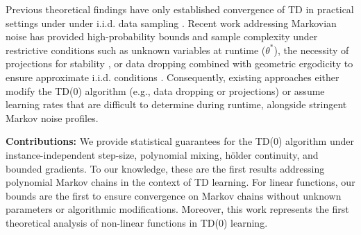 Previous theoretical findings have only established convergence of TD in practical settings under under i.i.d. data sampling \cite{tsitsiklis1996analysis, samsonov24}.
Recent work addressing Markovian noise has provided high-probability bounds and sample complexity under restrictive conditions such as unknown variables at runtime \cite{li2024high} ($\theta^*$), the necessity of projections for stability \cite{korda2015td, patil2023finite}, or data dropping combined with geometric ergodicity to ensure approximate i.i.d. conditions \cite{samsonov24}.
Consequently, existing approaches either modify the TD(0) algorithm (e.g., data dropping or projections) or assume learning rates that are difficult to determine during runtime, alongside stringent Markov noise profiles.

\textbf{Contributions:} We provide statistical guarantees for the TD(0) algorithm under instance-independent step-size, polynomial mixing, h\"{o}lder continuity, and bounded gradients.
To our knowledge, these are the first results addressing polynomial Markov chains in the context of TD learning. For linear functions, our bounds are the first to ensure convergence on Markov chains without unknown parameters or algorithmic modifications. Moreover, this work represents the first theoretical analysis of non-linear functions in TD(0) learning.

